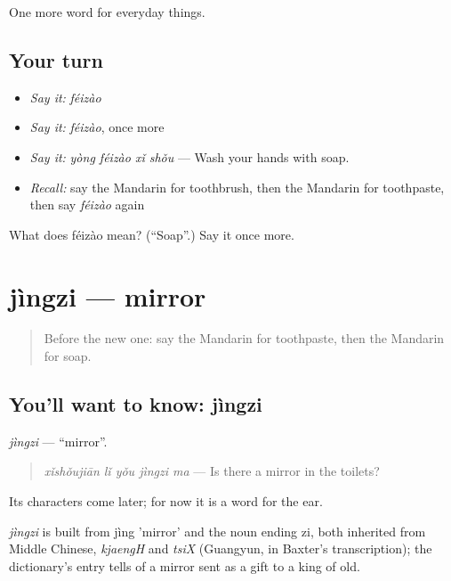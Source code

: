 \begin{grammarlens}[title={What you've built}]
One more word for everyday things.
\end{grammarlens}

\subsection*{Your turn}
\begin{itemize}
\raggedright
  \item \emph{Say it:} \emph{féizào}
  \item \emph{Say it:} \emph{féizào}, once more
  \item \emph{Say it:} \emph{yòng féizào xǐ shǒu} — Wash your hands with soap.
  \item \emph{Recall:} say the Mandarin for toothbrush, then the Mandarin for toothpaste, then say \emph{féizào} again
\end{itemize}

\begin{tcolorbox}[breakable,colback=teal!4,colframe=teal!35!black,title={Before you move on}]
What does féizào mean? (\textquotedblleft{}Soap\textquotedblright{}.) Say it once more.
\end{tcolorbox}
\section[jìngzi]{jìngzi — mirror}

\label{lesson:ZH-C105-jingzi}



\begin{quote}
Before the new one: say the Mandarin for toothpaste, then the Mandarin for soap.
\end{quote}

\subsection*{You'll want to know: jìngzi}
\emph{jìngzi} — \textquotedblleft{}mirror\textquotedblright{}.

\begin{quote}
\emph{xǐshǒujiān lǐ yǒu jìngzi ma} — Is there a mirror in the toilets?
\end{quote}

Its characters come later; for now it is a word for the ear.

\begin{cousinweb}
\emph{jìngzi} is built from jìng 'mirror' and the noun ending zi, both inherited from Middle Chinese, \emph{kjaengH} and \emph{tsiX} (Guangyun, in Baxter's transcription); the dictionary's entry tells of a mirror sent as a gift to a king of old.
\end{cousinweb}

